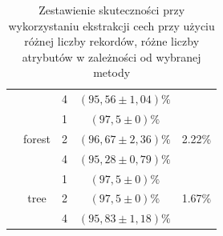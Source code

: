 \begin{table}[]
\begin{tabular}{|c|c|c|c|c|}
                      &                         & 4                & $ (95,56 \pm 1,04) \% $  & \\ \cline{2-5} 
                      & \multirow{3}{*}{forest} & 1                & $ (97,5 \pm 0) \% $       & \multirow{3}{*}{2.22\%} \\ \cline{3-4} 
                      &                         & 2                & $ (96,67 \pm 2,36) \% $   &\\ \cline{3-4} 
                      &                         & 4                & $ (95,28 \pm 0,79) \% $  & \\ \cline{2-5} 
                      & \multirow{3}{*}{tree}   & 1                & $ (97,5 \pm 0) \% $       & \multirow{3}{*}{1.67\%} \\ \cline{3-4} 
                      &                         & 2                & $ (97,5 \pm 0) \% $       &\\ \cline{3-4} 
                      &                         & 4                & $ (95,83 \pm 1,18) \% $   &\\ \hline
\end{tabular}
\caption{Zestawienie skuteczności przy wykorzystaniu ekstrakcji cech przy użyciu różnej liczby rekordów, różne liczby atrybutów w zależności od wybranej metody}
\label{table:fxTable}

\end{table}

